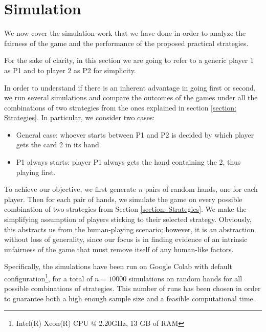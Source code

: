 \section{Simulation}\label{section:Simulation}
We now cover the simulation work that we have done in order to analyze the fairness of the game and the performance of the proposed practical strategies.

For the sake of clarity, in this section we are going to refer to a generic player 1 as P1 and to player 2 as P2 for simplicity.

In order to understand if there is an inherent advantage in going first or second, we run several simulations and compare the outcomes of the games under all the combinations of two strategies from the ones explained in section \ref{section: Strategies}. In particular, we consider two cases:
\begin{itemize}
	\item General case: whoever starts between P1 and P2 is decided by which player gets the card 2 in its hand.
	\item P1 always starts: player P1 always gets the hand containing the 2, thus playing first.
\end{itemize}
To achieve our objective, we first generate $n$ pairs of random hands, one for each player. Then for each pair of hands, we simulate the game on every possible combination of two strategies from Section \ref{section: Strategies}.
We make the simplifying assumption of players sticking to their selected strategy. Obviously, this abstracts us from the human-playing scenario; however, it is an abstraction without loss of generality, since our focus is in finding evidence of an intrinsic unfairness of the game that must remove itself of any human-like factors.

Specifically, the simulations have been run on Google Colab with default configuration\footnote{Intel(R) Xeon(R) CPU @ 2.20GHz, 13 GB of RAM}, for a total of $n = 10000$ simulations on random hands for all possible combinations of strategies. This number of runs has been chosen in order to guarantee both a high enough sample size and a feasible computational time.





